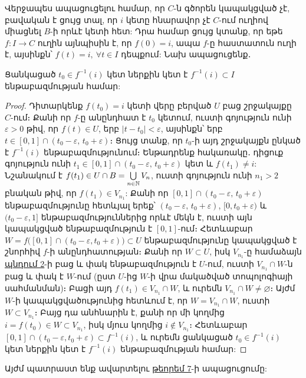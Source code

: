 \documentclass[./main.tex]{subfiles}
\begin{document}
\par Վերջապես ապացուցելու համար, որ $C$-ն գծորեն կապակցված չէ, բավական է ցույց տալ, որ $i$ կետը հնարավոր չէ $C$-ում ուղիով միացնել $B$-ի որևէ կետի հետ: Դրա համար ցույց կտանք, որ եթե $f :I\rightarrow C$ ուղին այնպիսին է, որ $f(0)=i$, ապա $f$-ը հաստատուն ուղի է, այսինքն՝ $f(t)=i,\ \forall t\in I$ դեպքում: Նախ ապացուցենք․

\begin{statement}\label{պնդում:3}
Ցանկացած $t_0 \in f^{-1}(i)$ կետ ներքին կետ է $f^{-1}(i)\subset I$ են\-թա\-բազ\-մու\-թ\-յան համար:
\end{statement}

\begin{proof}
Դիտարկենք $f(t_0)=i$ կետի վերը բերված $U$ բաց շրջակայքը $C\textrm{-ում}$։ Քանի որ $f$-ը անընդհատ է $t_0$ կետում, ուստի գոյություն ունի $\varepsilon>0$ թիվ, որ $f(t)\in U$, երբ $|t-t_0|<\varepsilon$, այսինքն՝ երբ $t\in [0,1]\cap (t_0-\varepsilon,\, t_0+\varepsilon)$։ Ցույց տանք, որ $t_0$-ի այդ շրջակայքն ընկած է $f^{-1}(i)$ ենթաբազմությունում։ Ենթադրենք հակառակը․ դիցուք գոյություն ունի $t_1 \in [0,1]\cap (t_0-\varepsilon,\, t_0+\varepsilon)$ կետ և $f(t_1)\neq i$: Նշանակում է $f(t_1) \in U\cap B=\bigcup\limits_{n\in \mathbb{N}} V_n$, ուստի գոյություն ունի $n_1>2$ բնական թիվ, որ $f(t_1) \in V_{n_1}$: Քանի որ $[0,1]\cap (t_0-\varepsilon,\, t_0+\varepsilon)$ ենթաբազմությունը հետևյալ երեք՝ $(t_0-\varepsilon,\, t_0+\varepsilon)$, $[0, t_0+\varepsilon)$ և $(t_0-\varepsilon,1]$ ենթաբազմություններից որևէ մեկն է, ուստի այն կապակցված ենթաբազմություն է $[0,1]$-ում։ Հետևաբար ${W=f\big([0,1]\cap (t_0-\varepsilon, t_0+\varepsilon)\big)\subset U}$ են\-թաբազմութ\-յու\-նը կապակցված է շնորհիվ $f$-ի անընդհատության։ Քանի որ $W\subset U$, իսկ $V_{n_1}$-ը համաձայն \hyperref[պնդում:2]{պնդում 2}-ի բաց և փակ ենթաբազմություն է $U$-ում, ուստի $V_{n_1}\cap W$-ն բաց և փակ է $W$-ում (ըստ $U$-ից $W$-ի վրա մակածված տոպոլոգիայի սահմանման)։ Բացի այդ $f(t_1)\in V_{n_1}\cap W$, և ուրեմն $V_{n_1}\cap W\neq \varnothing$։ Այժմ $W$-ի կապակցվածությունից հետևում է, որ $W=V_{n_1}\cap W$, ուստի $W\subset V_{n_1}$։ Բայց դա անհնարին է, քանի որ մի կողմից $i=f(t_0)\in W \subset V_{n_1}$, իսկ մյուս կողմից $i\not\in V_{n_1}$։ Հետևաբար $[0,1]\cap (t_0-\varepsilon, t_0+\varepsilon) \subset f^{-1}(i)$, և ուրեմն ցանկացած $t_0\in f^{-1}(i)$ կետ ներքին կետ է $f^{-1}(i)$ ենթաբազմության համար:
\end{proof}

\par Այժմ պատրաստ ենք ավարտելու \hyperref[ch15thm7]{թեորեմ 7}-ի ապացուցումը:
\end{document}
